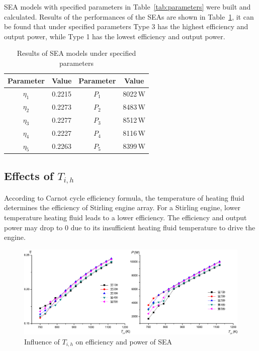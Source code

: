 SEA models with specified parameters in Table~\ref{tab:parameters} were built and calculated. Results of the performances of the SEAs are shown in Table~\ref{tab:result}, it can be found that under specified parameters Type 3 has the highest efficiency and output power, while Type 1 has the lowest efficiency and output power.

\begin{table}[htbp]
	\caption{Results of SEA models under specified parameters}
	\begin{center}
	\begin{tabular}{cccc}
		\toprule
		Parameter		&	Value	&	Parameter		&	Value\\
		\midrule
		$\eta_1$	&	0.2215	&	$P_1$		&	8022\,W\\
		$\eta_2$	&	0.2273	&	$P_2$		&	8483\,W\\
		$\eta_3$	&	0.2277	&	$P_3$		&	8512\,W\\
		$\eta_4$	&	0.2227	&	$P_4$		&	8116\,W\\
		$\eta_5$	&	0.2263	&	$P_5$		&	8399\,W\\		
		\bottomrule
	\end{tabular}
	\end{center}
	\label{tab:result}
\end{table}

\subsection{Effects of $T_{i,h}$}
According to Carnot cycle efficiency formula, the temperature of heating fluid determines the efficiency of Stirling engine array. For a Stirling engine, lower temperature heating fluid leads to a lower efficiency. The efficiency and output power may drop to 0 due to its insufficient heating fluid temperature to drive the engine.

\noindent \begin{figure}[htbp]
\begin{center}
	\includegraphics[width = 0.7\columnwidth]{fig/T_ih}
	\caption{Influence of $T_{i,h}$ on efficiency and power of SEA}
	\label{fig:Ti_h}
\end{center}
\end{figure}

